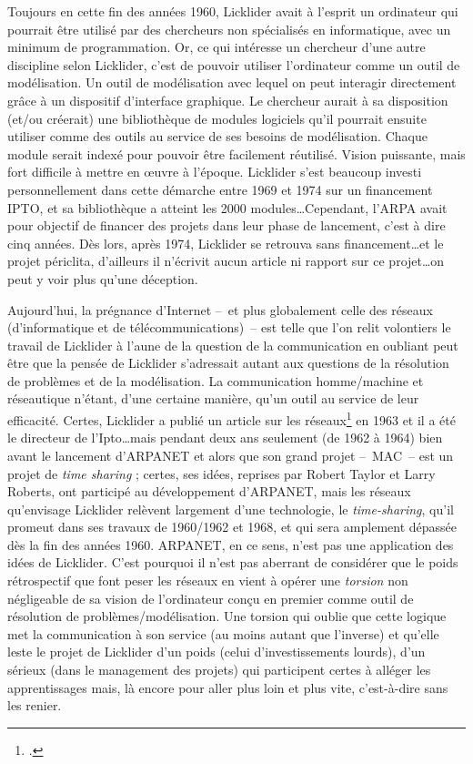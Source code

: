\documentclass{FramateX}
\begin{document}
\begin{refsection}
Toujours en cette fin des années 1960, Licklider avait à l'esprit un ordinateur qui
pourrait être utilisé par des chercheurs non spécialisés en
informatique, avec un minimum de programmation. Or, ce qui intéresse un
chercheur d'une autre discipline selon Licklider, c'est de pouvoir
utiliser l'ordinateur comme un outil de modélisation. Un outil de
modélisation avec lequel on peut interagir directement grâce à un
dispositif d'interface graphique. Le chercheur aurait à sa disposition
(et/ou créerait) une bibliothèque de modules logiciels qu'il pourrait
ensuite utiliser comme des outils au service de ses besoins de
modélisation. Chaque module serait indexé pour pouvoir être facilement
réutilisé. Vision puissante, mais fort difficile à mettre en œuvre à
l'époque. Licklider s'est beaucoup investi personnellement dans
cette démarche entre 1969 et 1974 sur un financement IPTO, et sa
bibliothèque a atteint les 2000 modules\ldots Cependant, l'ARPA avait pour
objectif de financer des projets dans leur phase de lancement, c'est à dire cinq années.
 Dès lors, après 1974, Licklider
se retrouva sans financement\ldots et le projet périclita, d'ailleurs il
n'écrivit aucun article ni rapport sur ce projet\ldots on peut y voir plus
qu'une déception.


Aujourd'hui, la prégnance d'Internet --~et plus globalement
celle des réseaux (d'informatique et de télécommunications)~--  est telle que l'on
relit volontiers le travail de Licklider à l'aune de la question de
la communication en oubliant peut être que la pensée de
 Licklider s'adressait autant aux questions de la résolution de
problèmes et de la modélisation. La communication homme/machine et
réseautique n'étant, d'une certaine manière, qu'un outil au service de
leur efficacité. Certes, Licklider a publié un article sur les
réseaux\footnote{\cite{licklidermemorandum1963}.} en 1963 et il a
été le directeur de l'Ipto\ldots mais pendant deux ans seulement (de 1962 à
1964) bien avant le lancement d'ARPANET et alors que son grand projet --~MAC~-- est un projet de \textit{time sharing} ; certes, ses idées, reprises par Robert Taylor et Larry Roberts, ont participé au développement
d'ARPANET, mais les réseaux qu'envisage Licklider relèvent largement
d'une technologie, le \textit{time-sharing}, qu'il promeut dans ses travaux de
1960/1962 et 1968, et qui sera amplement dépassée dès la fin des années
1960. ARPANET, en ce sens, n'est pas une application des idées de Licklider. C'est pourquoi il n'est pas aberrant de considérer que le
poids rétrospectif que font peser les réseaux en vient à opérer une
\textit{torsion} non négligeable de sa vision de l'ordinateur conçu en premier comme outil de
résolution de problèmes/modélisation. Une torsion qui oublie que cette
logique met la communication à son service (au moins autant que
l'inverse) et qu'elle leste le projet de Licklider d'un poids (celui d'investissements lourds), d'un sérieux (dans le management des projets) qui participent certes à alléger les
apprentissages mais, là encore pour aller plus loin et plus vite, c'est-à-dire sans les renier.


\end{refsection}
\end{document}
